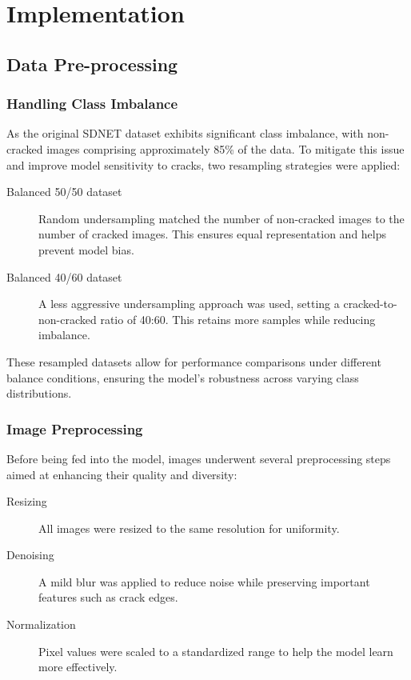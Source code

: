 \chapter{Implementation}

\section{Data Pre-processing}

\subsection{Handling Class Imbalance}

As the original SDNET dataset exhibits significant class imbalance, with non-cracked images comprising approximately 85\% of the data. To mitigate this issue and improve model sensitivity to cracks, two resampling strategies were applied:

\begin{description}
	\item[Balanced 50/50 dataset] Random undersampling matched the number of non-cracked images to the number of cracked images. This ensures equal representation and helps prevent model bias.
	\item[Balanced 40/60 dataset] A less aggressive undersampling approach was used, setting a cracked-to-non-cracked ratio of 40:60. This retains more samples while reducing imbalance.
\end{description}

These resampled datasets allow for performance comparisons under different balance conditions, ensuring the model's robustness across varying class distributions.

\subsection{Image Preprocessing}

Before being fed into the model, images underwent several preprocessing steps aimed at enhancing their quality and diversity:

\begin{description}
	\item[Resizing] All images were resized to the same resolution for uniformity.
	\item[Denoising] A mild blur was applied to reduce noise while preserving important features such as crack edges.
	\item[Normalization] Pixel values were scaled to a standardized range to help the model learn more effectively.
\end{description}

